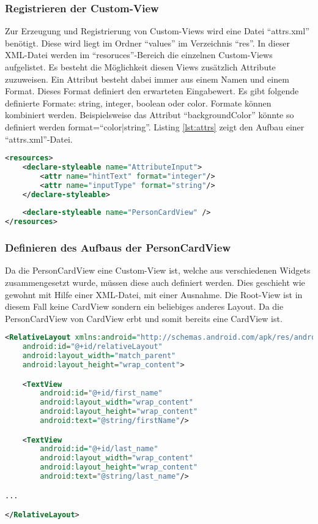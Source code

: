 \subsubsection{Registrieren der Custom-View}
Zur Erzeugung und Registrierung von Custom-Views wird eine Datei \enquote{attrs.xml} benötigt. Diese wird liegt im Ordner \enquote{values} im Verzeichnis \enquote{res}. 
In dieser XML-Datei werden im \enquote{resoruces}-Bereich die einzelnen Custom-Views aufgelistet. Es besteht die Möglichkeit diesen Views zusätzlich Attribute zuzuweisen. Ein Attribut besteht dabei immer aus einem Namen und einem Format. Dieses Format definiert den erwarteten Eingabewert. Es gibt folgende definierte Formate: string, integer, boolean oder color. 
Formate können kombiniert werden. Beispielsweise das Attribut \enquote{backgroundColor} könnte so definiert werden format=\enquote{color|string}. Listing \ref{lst:attrs} zeigt den Aufbau einer \enquote{attrs.xml}-Datei.

\begin{lstlisting}[label=lst:attrs,
language=xml,
firstnumber=1,
caption=Aufbau einer \enquote{attrs.xml} - Datei]				   
<resources>
	<declare-styleable name="AttributeInput">
		<attr name="hintText" format="integer"/>
		<attr name="inputType" format="string"/>
	</declare-styleable>
	
	<declare-styleable name="PersonCardView" />
</resources>
\end{lstlisting}

\subsubsection{Definieren des Aufbaus der PersonCardView}

Da die PersonCardView eine Custom-View ist, welche aus verschiedenen Widgets zusammengesetzt wurde, müssen diese auch definiert werden. Dies geschieht wie gewohnt mit Hilfe einer XML-Datei, mit einer Ausnahme. Die Root-View ist in diesem Fall keine CardView sondern ein beliebiges anderes Layout. Da die PersonCardView von CardView erbt und somit bereits eine CardView ist.

\begin{lstlisting}[label=lst:personCardViewXml,
language=xml,
firstnumber=1,
caption=Aufbau der PersonCardView mit Hilfe einer XML-Datei]				   
<RelativeLayout xmlns:android="http://schemas.android.com/apk/res/android"
	android:id="@+id/relativeLayout"
	android:layout_width="match_parent"
	android:layout_height="wrap_content">

	<TextView
		android:id="@+id/first_name"
		android:layout_width="wrap_content"
		android:layout_height="wrap_content"
		android:text="@string/firstName"/>

	<TextView
		android:id="@+id/last_name"
		android:layout_width="wrap_content"
		android:layout_height="wrap_content"
		android:text="@string/last_name"/>

...

</RelativeLayout>
\end{lstlisting}

